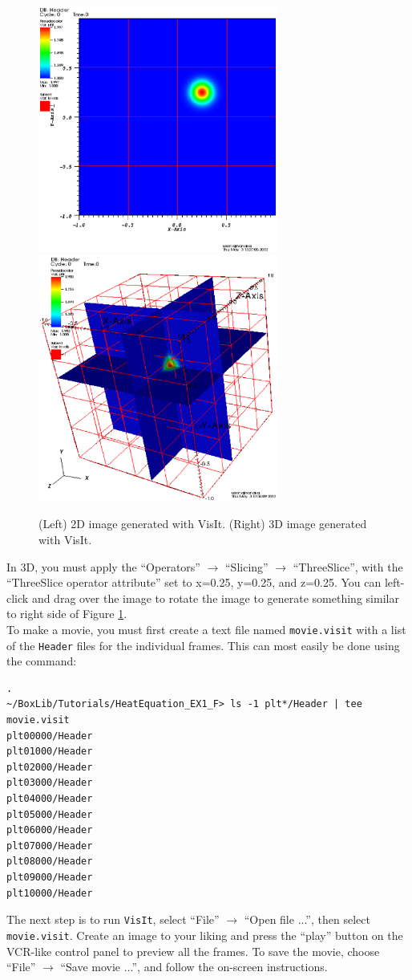 \begin{figure}[tb]
\centering
\includegraphics[width=3.1in]{./GettingStarted/VisIt_2D}
\includegraphics[width=3.1in]{./GettingStarted/VisIt_3D}
\caption{(Left) 2D image generated with VisIt.  (Right) 3D image generated with VisIt.}
\label{Fig:VisIt}
\end{figure}

In 3D, you must apply the ``Operators'' $\rightarrow$ ``Slicing'' $\rightarrow$ ``ThreeSlice'', with the 
``ThreeSlice operator attribute'' set to x=0.25, y=0.25, and z=0.25.  You can left-click and drag
over the image to rotate the image to generate something similar to right side of Figure \ref{Fig:VisIt}.\\

To make a movie, you must first create a text file named {\tt movie.visit} with a list of the {\tt Header} 
files for the individual frames.  This can most easily be done using the command:
\begin{lstlisting}[backgroundcolor=\color{light-red}].
~/BoxLib/Tutorials/HeatEquation_EX1_F> ls -1 plt*/Header | tee movie.visit
plt00000/Header
plt01000/Header
plt02000/Header
plt03000/Header
plt04000/Header
plt05000/Header
plt06000/Header
plt07000/Header
plt08000/Header
plt09000/Header
plt10000/Header
\end{lstlisting}
The next step is to run {\tt VisIt}, select ``File'' $\rightarrow$ ``Open file ...'',
then select {\tt movie.visit}.  Create an image to your liking and press the ``play'' button
on the VCR-like control panel to preview all the frames.  To save the movie, choose
``File'' $\rightarrow$ ``Save movie ...'', and follow the on-screen instructions.

